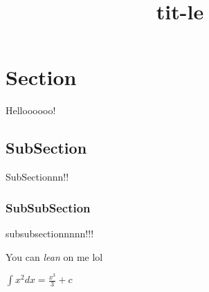 \documentclass{article}
\title{tit-le}
\begin{document}
    \section{Section}
    Helloooooo!

    \subsection{SubSection}
    SubSectionnn!!

    \subsubsection{SubSubSection}
    subsubsectionnnnn!!!

    \begin{center}
        You can \textsl{lean} on me lol
    \end{center}

    \begin{math}
        \int x^2 dx = \frac{x^3}{3} + c
    \end{math}
\end{document}
